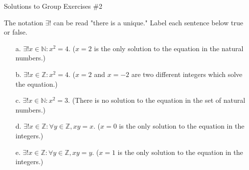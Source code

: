 \documentclass[10pt]{beamer}
\begin{document}
\begin{frame}{Solutions to Group Exercises \#2}

The notation $\exists!$ can be read "there is a unique." Label each sentence below true or false.

    \begin{itemize}
        \item[a.] $\exists! x \in \mathbb{N}: x^2=4.$   ($x=2$ is the only solution to the equation in the natural numbers.)
        \item[b.] $\exists! x \in \mathbb{Z}: x^2=4.$    ($x=2$ and $x=-2$ are two different integers which solve the equation.)
        \item[c.] $\exists! x \in \mathbb{N}: x^2=3.$    (There is no solution to the equation in the set of natural numbers.)
        \item[d.] $\exists! x \in \mathbb{Z}: \forall y \in \mathbb{Z}, xy=x.$   ($x=0$ is the only solution to the equation in the integers.)
        \item[e.] $\exists! x \in \mathbb{Z}: \forall y \in \mathbb{Z}, xy=y.$  ($x=1$ is the only solution to the equation in the integers.)
    \end{itemize}


\end{frame}
\end{document}
